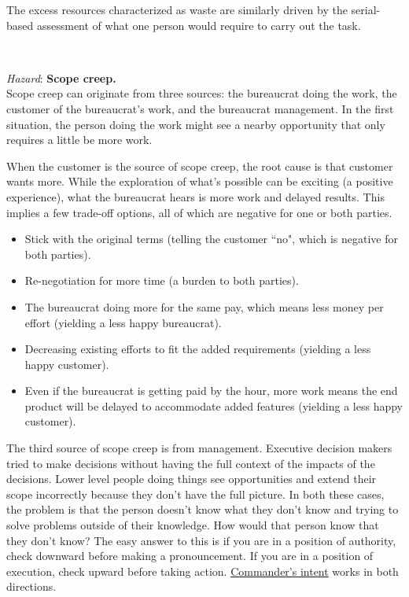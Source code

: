 The excess resources characterized as waste are similarly driven by the serial-based assessment of what one person would require to carry out the task. 

\ \\

\begin{samepage}
\textit{Hazard}: \textbf{Scope creep.}\label{sec:scope-creep} \\
Scope creep can originate from three sources: the bureaucrat doing the work, the customer of the bureaucrat's work, and the bureaucrat management. In the first situation, the person doing the work might see a nearby opportunity that only requires a little be more work. 
\end{samepage}

When the customer is the source of scope creep, the root cause is that customer wants more. While the exploration of what's possible can be exciting (a positive experience), what the bureaucrat hears is more work and delayed results. This implies a few trade-off options, all of which are negative for one or both parties.
\begin{itemize}
    \item Stick with the original terms (telling the customer ``no", which is negative for both parties).
    \item Re-negotiation for more time (a burden to both parties).
    \item The bureaucrat doing more for the same pay, which means less money per effort (yielding a less happy bureaucrat).
    \item Decreasing existing efforts to fit the added requirements (yielding a less happy customer).
    \item Even if the bureaucrat is getting paid by the hour, more work means the end product will be delayed to accommodate added features (yielding a less happy customer).
\end{itemize}

The third source of scope creep is from management. Executive decision makers tried to make decisions without having the full context of the impacts of the decisions. Lower level people doing things see opportunities and extend their scope incorrectly because they don't have the full picture. In both these cases, the problem is that the person doesn't know what they don't know and trying to solve problems outside of their knowledge. How would that person know that they don't know? The easy answer to this is if you are in a position of authority, check downward before making a pronouncement. If you are in a position of execution, check upward before taking action. \href{https://en.wikipedia.org/wiki/Intent_(military)#Commander's_intent}{Commander's intent} works in both directions.


